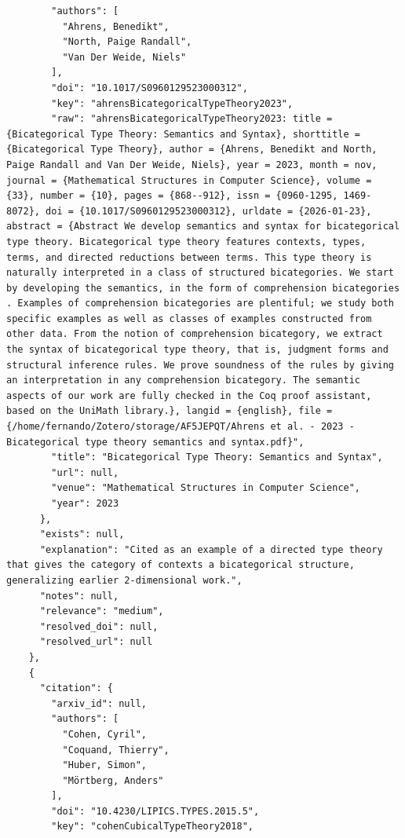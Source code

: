 \documentclass[11pt]{article}
\begin{document}
\begin{verbatim}
        "authors": [
          "Ahrens, Benedikt",
          "North, Paige Randall",
          "Van Der Weide, Niels"
        ],
        "doi": "10.1017/S0960129523000312",
        "key": "ahrensBicategoricalTypeTheory2023",
        "raw": "ahrensBicategoricalTypeTheory2023: title = {Bicategorical Type Theory: Semantics and Syntax}, shorttitle = {Bicategorical Type Theory}, author = {Ahrens, Benedikt and North, Paige Randall and Van Der Weide, Niels}, year = 2023, month = nov, journal = {Mathematical Structures in Computer Science}, volume = {33}, number = {10}, pages = {868--912}, issn = {0960-1295, 1469-8072}, doi = {10.1017/S0960129523000312}, urldate = {2026-01-23}, abstract = {Abstract We develop semantics and syntax for bicategorical type theory. Bicategorical type theory features contexts, types, terms, and directed reductions between terms. This type theory is naturally interpreted in a class of structured bicategories. We start by developing the semantics, in the form of comprehension bicategories . Examples of comprehension bicategories are plentiful; we study both specific examples as well as classes of examples constructed from other data. From the notion of comprehension bicategory, we extract the syntax of bicategorical type theory, that is, judgment forms and structural inference rules. We prove soundness of the rules by giving an interpretation in any comprehension bicategory. The semantic aspects of our work are fully checked in the Coq proof assistant, based on the UniMath library.}, langid = {english}, file = {/home/fernando/Zotero/storage/AF5JEPQT/Ahrens et al. - 2023 - Bicategorical type theory semantics and syntax.pdf}",
        "title": "Bicategorical Type Theory: Semantics and Syntax",
        "url": null,
        "venue": "Mathematical Structures in Computer Science",
        "year": 2023
      },
      "exists": null,
      "explanation": "Cited as an example of a directed type theory that gives the category of contexts a bicategorical structure, generalizing earlier 2-dimensional work.",
      "notes": null,
      "relevance": "medium",
      "resolved_doi": null,
      "resolved_url": null
    },
    {
      "citation": {
        "arxiv_id": null,
        "authors": [
          "Cohen, Cyril",
          "Coquand, Thierry",
          "Huber, Simon",
          "Mörtberg, Anders"
        ],
        "doi": "10.4230/LIPICS.TYPES.2015.5",
        "key": "cohenCubicalTypeTheory2018",

\end{verbatim}
\end{document}
